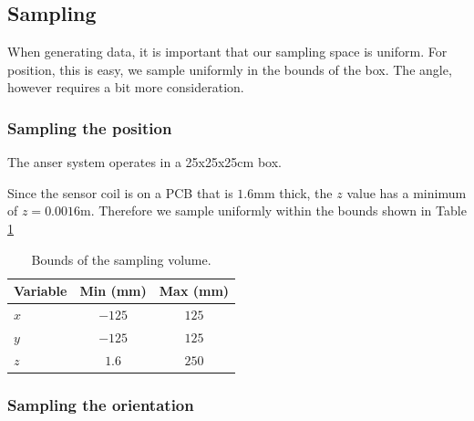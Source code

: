 

\subsection{Sampling}
When generating data, it is important that our sampling space is uniform. For position, this is easy, we sample uniformly in the bounds of the box. The angle, however requires a bit more consideration.

\subsubsection{Sampling the position}
The anser system operates in a 25x25x25cm box. 

Since the sensor coil is on a PCB that is $1.6$mm thick, the $z$ value has a minimum of $z = 0.0016$m. Therefore we sample uniformly within the bounds shown in Table \ref{tab:pos_bounds} 

\begin{table}
  \centering
  \begin{tabular}{lcc}
    \toprule
    Variable & Min (mm) & Max (mm) \\
    \midrule
    $x$ & $-125$ & $125$ \\
    $y$ & $-125$ & $125$ \\
    $z$ & $1.6$ & $250$ \\
    \bottomrule
  \end{tabular}
  \caption{Bounds of the sampling volume.}
  \label{tab:pos_bounds}
\end{table}
\subsubsection{Sampling the orientation}

